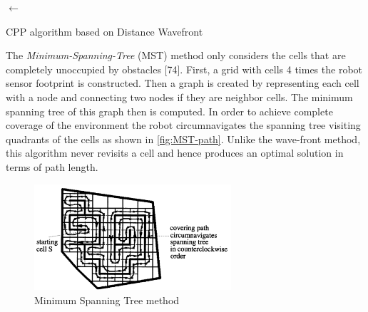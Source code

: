 \begin{algorithm}

	\BlankLine
	\SCell $\leftarrow$ \CCell \;
\caption{CPP algorithm based on Distance Wavefront}
\label{alg:Wavefront-distance}
\end{algorithm}
The \textit{Minimum-Spanning-Tree} (MST) method only considers the cells that are completely unoccupied by obstacles [74]. First, a grid with cells 4 times the robot sensor footprint is constructed. Then a graph is created by representing each cell with a node and connecting two nodes if they are neighbor cells. The minimum spanning tree of this graph then is computed. In order to achieve complete coverage of the environment the robot circumnavigates the spanning tree visiting quadrants of the cells as shown in \autoref{fig:MST-path}. Unlike the wave-front method, this algorithm never revisits a cell and hence produces an optimal solution in terms of path length. 
\begin{figure}[ht]
    \centering
    \includegraphics[width=0.65\textwidth]{figures/C3/MST-path.png}
    \caption{Minimum Spanning Tree method}
    \label{fig:MST-path}
\end{figure}

